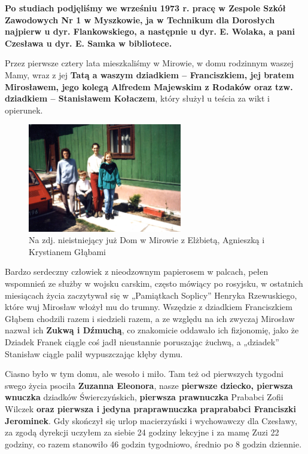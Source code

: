 \textbf{Po studiach podjęliśmy we wrześniu 1973 r. pracę w Zespole Szkół Zawodowych Nr 1 w Myszkowie, ja w Technikum dla Dorosłych najpierw u dyr. Flankowskiego, a następnie u dyr. E. Wolaka, a pani Czesława u dyr. E. Samka w bibliotece.}

Przez pierwsze cztery lata mieszkaliśmy w Mirowie, w domu rodzinnym waszej Mamy, wraz z jej \textbf{Tatą a waszym dziadkiem – Franciszkiem, jej bratem Mirosławem, jego kolegą Alfredem Majewskim z Rodaków oraz tzw. dziadkiem – Stanisławem Kołaczem}, który służył u teścia za wikt i opierunek.
\begin{figure}[!h]
\begin{center}
\includegraphics[width=0.6\textwidth]{photo/mirow_dom.jpg}
\caption[Nieistniejący już Dom w Mirowie z Elżbietą, Agnieszką i Krystianem Głąbami]{Na zdj. nieistniejący już Dom w Mirowie z Elżbietą, Agnieszką i Krystianem Głąbami}
\end{center}
\end{figure}

Bardzo serdeczny człowiek z nieodzownym papierosem w palcach, pełen wspomnień ze służby w wojsku carskim, często mówiący po rosyjsku, w ostatnich miesiącach życia zaczytywał się w „Pamiątkach Soplicy” Henryka Rzewuskiego, które wuj Mirosław włożył mu do trumny. Wszędzie z dziadkiem Franciszkiem Głąbem chodzili razem i siedzieli razem, a ze względu na ich zwyczaj Mirosław nazwał ich \textbf{Zukwą i Dźmuchą}, co znakomicie oddawało ich fizjonomię, jako że Dziadek Franek ciągle coś jadł nieustannie poruszając żuchwą, a „dziadek” Stanisław ciągle palił wypuszczając kłęby dymu. 

Ciasno było w tym domu, ale wesoło i miło. Tam też od pierwszych tygodni swego życia psociła \textbf{Zuzanna Eleonora}, nasze \textbf{pierwsze dziecko, pierwsza wnuczka} dziadków Świerczyńskich, \textbf{pierwsza prawnuczka	} Prababci Zofii Wilczek \textbf{oraz pierwsza i jedyna praprawnuczka praprababci Franciszki Jerominek}. Gdy skończył się urlop macierzyński i wychowawczy dla Czesławy, za zgodą dyrekcji uczyłem za siebie 24 godziny lekcyjne i za mamę Zuzi 22 godziny, co razem stanowiło 46 godzin tygodniowo, średnio po 8 godzin dziennie.

